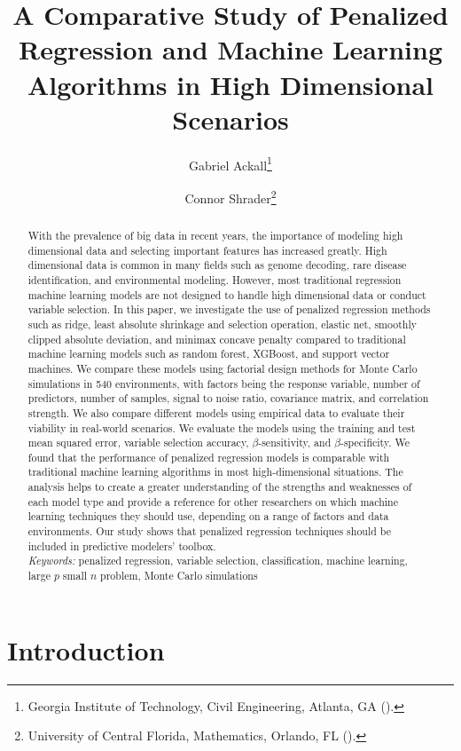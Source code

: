 \documentclass[final,onefignum,onetabnum]{siuro210301}
\title{A Comparative Study of Penalized Regression and Machine Learning Algorithms in High Dimensional Scenarios}
\author{Gabriel Ackall\thanks{Georgia Institute of Technology, Civil Engineering, Atlanta, GA
		(\email{gackall@gatech.edu}).}
	\and Connor Shrader\thanks{University of Central  Florida, Mathematics, Orlando, FL
		(\email{connorshrader@knights.ucf.edu}).}}
\begin{document}
	\maketitle
	\begin{abstract}
		With the prevalence of big data in recent years, the importance of modeling high dimensional data and selecting important features has increased greatly. High dimensional data is common in many fields such as genome decoding, rare disease identification, and environmental modeling. However, most traditional regression machine learning models are not designed to handle high dimensional data or conduct variable selection. In this paper, we investigate the use of penalized regression methods such as ridge, least absolute shrinkage and selection operation, elastic net, smoothly clipped absolute deviation, and minimax concave penalty compared to traditional machine learning models such as random forest, XGBoost, and support vector machines. We compare these models using factorial design methods for Monte Carlo simulations in 540 environments, with factors being the response variable, number of predictors, number of samples, signal to noise ratio, covariance matrix, and correlation strength. We also compare different models using empirical data to evaluate their viability in real-world scenarios. We evaluate the models using the training and test mean squared error, variable selection accuracy, $\beta$-sensitivity, and $\beta$-specificity. We found that the performance of penalized regression models is comparable with traditional machine learning algorithms in most high-dimensional situations. The analysis helps to create a greater understanding of the strengths and weaknesses of each model type and provide a reference for other researchers on which machine learning techniques they should use, depending on a range of factors and data environments. Our study shows that penalized regression techniques should be included in predictive modelers’ toolbox. \\
		
		\textit{Keywords:} penalized regression, variable selection, classification, machine learning, large $p$ small $n$ problem, Monte Carlo simulations
	\end{abstract}
	
	\newpage
	
	\section{Introduction}
	
\end{document}
